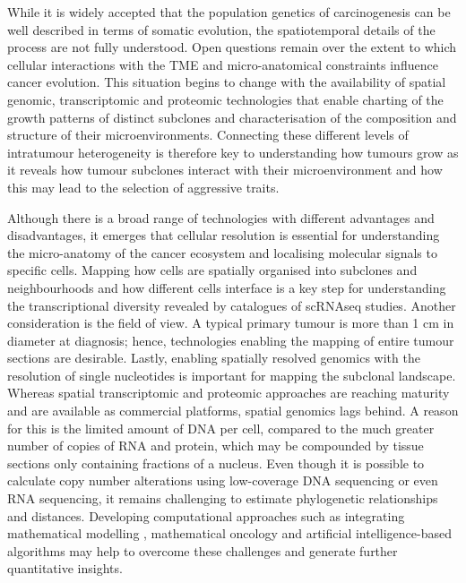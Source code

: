 While it is widely accepted that the population genetics of carcinogenesis can be well described in terms of somatic evolution, the spatiotemporal details of the process are not fully understood. Open questions remain over the extent to which cellular interactions with the \ac{TME} and micro-anatomical constraints influence cancer evolution. This situation begins to change with the availability of spatial genomic, transcriptomic and proteomic technologies that enable charting of the growth patterns of distinct subclones and characterisation of the composition and structure of their microenvironments. Connecting these different levels of intratumour heterogeneity is therefore key to understanding how tumours grow as it reveals how tumour subclones interact with their microenvironment and how this may lead to the selection of aggressive traits.

Although there is a broad range of technologies with different advantages and disadvantages, it emerges that cellular resolution is essential for understanding the micro-anatomy of the cancer ecosystem and localising molecular signals to specific cells. Mapping how cells are spatially organised into subclones and neighbourhoods and how different cells interface is a key step for understanding the transcriptional diversity revealed by catalogues of \ac{scRNAseq} studies. Another consideration is the field of view. A typical primary tumour is more than 1 cm in diameter at diagnosis; hence, technologies enabling the mapping of entire tumour sections are desirable. Lastly, enabling spatially resolved genomics with the resolution of single nucleotides is important for mapping the subclonal landscape. Whereas spatial transcriptomic and proteomic approaches are reaching maturity and are available as commercial platforms, spatial genomics lags behind. A reason for this is the limited amount of DNA per cell, compared to the much greater number of copies of RNA and protein, which may be compounded by tissue sections only containing fractions of a nucleus. Even though it is possible to calculate copy number alterations using low-coverage DNA sequencing or even RNA sequencing, it remains challenging to estimate phylogenetic relationships and distances. Developing computational approaches such as integrating mathematical modelling \parencite{Gatenbee2022-hb}, mathematical oncology and artificial intelligence-based algorithms may help to overcome these challenges and generate further quantitative insights.

